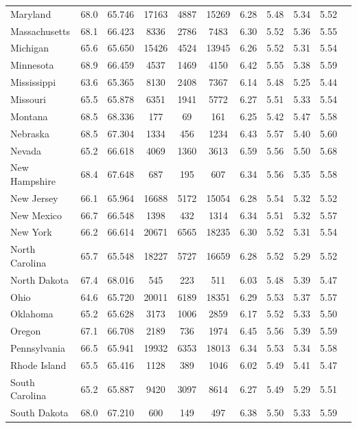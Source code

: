 \documentclass{acm_proc_article-sp}
\begin{document}
\begin{table}[t!]
\begin{center}
\begin{tabular}{l c c c c c c c c c c }
Maryland       & 68.0 & 65.746 & 17163 & 4887 & 15269 & 6.28 & 5.48 & 5.34 & 5.52 \\
Massachusetts  & 68.1 & 66.423 & 8336 & 2786 & 7483 & 6.30 & 5.52 & 5.36 & 5.55 \\
Michigan       & 65.6 & 65.650 & 15426 & 4524 & 13945 & 6.26 & 5.52 & 5.31 & 5.54 \\
Minnesota      & 68.9 & 66.459 & 4537 & 1469 & 4150 & 6.42 & 5.55 & 5.38 & 5.59 \\
Mississippi    & 63.6 & 65.365 & 8130 & 2408 & 7367 & 6.14 & 5.48 & 5.25 & 5.44 \\
Missouri       & 65.5 & 65.878 & 6351 & 1941 & 5772 & 6.27 & 5.51 & 5.33 & 5.54 \\
Montana        & 68.5 & 68.336 & 177 & 69 & 161 & 6.25 & 5.42 & 5.47 & 5.58 \\
Nebraska       & 68.5 & 67.304 & 1334 & 456 & 1234 & 6.43 & 5.57 & 5.40 & 5.60 \\
Nevada         & 65.2 & 66.618 & 4069 & 1360 & 3613 & 6.59 & 5.56 & 5.50 & 5.68 \\
New Hampshire  & 68.4 & 67.648 & 687 & 195 & 607 & 6.34 & 5.56 & 5.35 & 5.58 \\
New Jersey     & 66.1 & 65.964 & 16688 & 5172 & 15054 & 6.28 & 5.54 & 5.32 & 5.52 \\
New Mexico     & 66.7 & 66.548 & 1398 & 432 & 1314 & 6.34 & 5.51 & 5.32 & 5.57 \\
New York       & 66.2 & 66.614 & 20671 & 6565 & 18235 & 6.30 & 5.52 & 5.31 & 5.54 \\
North Carolina & 65.7 & 65.548 & 18227 & 5727 & 16659 & 6.28 & 5.52 & 5.29 & 5.52 \\
North Dakota   & 67.4 & 68.016 & 545 & 223 & 511 & 6.03 & 5.48 & 5.39 & 5.47 \\
Ohio           & 64.6 & 65.720 & 20011 & 6189 & 18351 & 6.29 & 5.53 & 5.37 & 5.57 \\
Oklahoma       & 65.2 & 65.628 & 3173 & 1006 & 2859 & 6.17 & 5.52 & 5.33 & 5.50 \\
Oregon         & 67.1 & 66.708 & 2189 & 736 & 1974 & 6.45 & 5.56 & 5.39 & 5.59 \\
Pennsylvania   & 66.5 & 65.941 & 19932 & 6353 & 18013 & 6.34 & 5.53 & 5.34 & 5.58 \\
Rhode Island   & 65.5 & 65.416 & 1128 & 389 & 1046 & 6.02 & 5.49 & 5.41 & 5.47 \\
South Carolina & 65.2 & 65.887 & 9420 & 3097 & 8614  & 6.27 & 5.49 & 5.29 & 5.51 \\
South Dakota   & 68.0 & 67.210 & 600 & 149 & 497 & 6.38 & 5.50 & 5.33 & 5.59 \\

\end{tabular}
\end{center}
\end{table}
\end{document}
